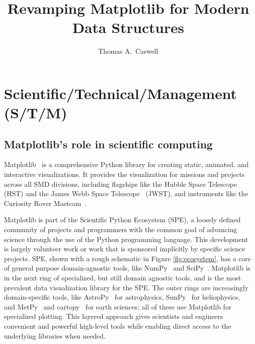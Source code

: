 \documentclass[12pt]{article}
\numberwithin{page}{section}
\begin{document}
\title{Revamping Matplotlib for Modern Data Structures}
\author{Thomas A.\ Caswell}
\date{}
\maketitle

\setcounter{tocdepth}{2}
\tableofcontents
\thispagestyle{empty}
\newpage

\section{Scientific/Technical/Management (S/T/M)}
\setcounter{page}{1}

\subsection{Matplotlib's role in scientific computing}

Matplotlib~\cite{Hunter:2007} is a comprehensive Python library
for creating static, animated, and interactive visualizations.
It provides the visualization for missions and projects
across all SMD divisions, including flagships like the Hubble
Space Telescope (HST) and the James Webb Space
Telescope~\cite{jwst_pipeline} (JWST), and instruments like the
Curiosity Rover Mastcam~\cite{https://doi.org/10.1002/2016EA000219}.

Matplotlib is part of the Scientific Python Ecosystem (SPE), a loosely
defined community of projects and programmers with the common goal of
advancing science through the use of the Python programming language.
This development is largely volunteer work or work that is sponsored
implicitly by specific science projects.  SPE, shown with a rough
schematic in Figure \ref{fig:ecosystem}, has a core of general purpose
domain-agnostic tools, like NumPy~\cite{Harris2020} and
SciPy~\cite{Virtanen2020}. Matplotlib is in the next ring of
specialized, but still domain agnostic tools, and is the most
prevalent data visualization library for the SPE.  The outer rings are
increasingly domain-specific tools, like
AstroPy~\cite{astropy:2013,
  astropy:2018} for astrophysics,
SunPy~\cite{sunpy_community2020}  for heliophysics, and
MetPy~\cite{metpy} and cartopy~\cite{Cartopy} for earth sciences; all of these use
Matplotlib for specialized plotting.  This layered approach gives
scientists and engineers convenient and powerful high-level tools
while enabling direct access to the underlying libraries when needed.
\end{document}
